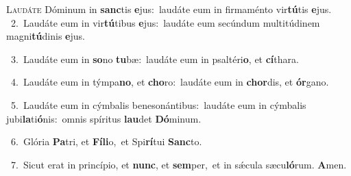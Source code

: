 \lettrine{\initial\textcolor{\initialcolor}{L}}{audáte} Dóminum in \textbf{sanc}\-tis \textbf{e}\-jus:~\star laudáte eum in firmaménto vir\-\textbf{tú}\-tis \textbf{e}\-jus.\\
{\numbfont\textcolor{\numbcolor}{~2.}}~Laudáte eum in vir\-\textbf{tú}\-tibus \textbf{e}\-jus:~\star laudáte eum secúndum multitúdinem magni\-\textbf{tú}\-dinis \textbf{e}\-jus.\par
{\numbfont\textcolor{\numbcolor}{~3.}}~Laudáte eum in \textbf{so}\-no \textbf{tu}\-bæ:~\star laudáte eum in psaltéri\-\textbf{o}\-, et \textbf{cí}\-thara.\par
{\numbfont\textcolor{\numbcolor}{~4.}}~Laudáte eum in týmpa\-\textbf{no}\-, et \textbf{cho}\-ro:~\star laudáte eum in \textbf{chor}\-dis, et \textbf{ór}\-gano.\par
{\numbfont\textcolor{\numbcolor}{~5.}}~Laudáte eum in cýmbalis benesonántibus:~\dagger laudáte eum in cýmbalis jubi\-\textbf{la}\-ti\-\textbf{ó}\-nis:~\star omnis spíritus \textbf{lau}\-det \textbf{Dó}\-minum.\par
{\numbfont\textcolor{\numbcolor}{~6.}}~Glória \textbf{Pa}\-tri, et \textbf{Fí}\-\textbf{li}o,~\star et Spi\-\textbf{rí}\-tui \textbf{Sanc}\-to.\par
{\numbfont\textcolor{\numbcolor}{~7.}}~Sicut erat in princípio, et \textbf{nunc}\-, et \textbf{sem}\-per,~\star et in sǽcula sæcu\-\textbf{ló}\-rum. \textbf{A}\-men.\par
